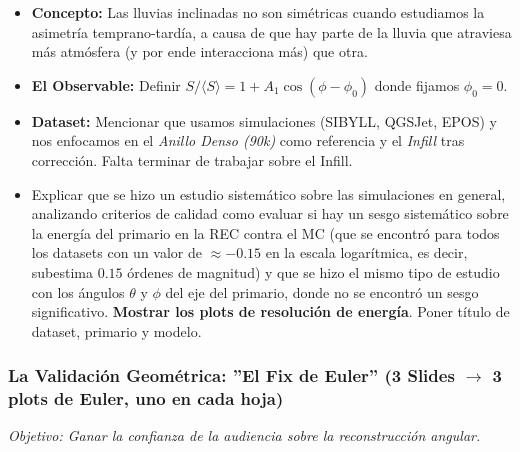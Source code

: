 \begin{itemize}
	\item \textbf{Concepto:} Las lluvias inclinadas no son simétricas cuando estudiamos la asimetría temprano-tardía, a causa de que hay parte de la lluvia que atraviesa más atmósfera (y por ende interacciona más) que otra.
	\item \textbf{El Observable:} Definir $S / \langle S \rangle = 1 + A_1 \cos(\phi - \phi_0)$ donde fijamos $\phi_0 = 0$.
	\item \textbf{Dataset:} Mencionar que usamos simulaciones (SIBYLL, QGSJet, EPOS) y nos enfocamos en el \textit{Anillo Denso (90k)} como referencia y el \textit{Infill} tras corrección. Falta terminar de trabajar sobre el Infill.
	\item Explicar que se hizo un estudio sistemático sobre las simulaciones en general, analizando criterios de calidad como evaluar si hay un sesgo sistemático sobre la energía del primario en la REC contra el MC (que se encontró para todos los datasets con un valor de $\approx -0.15$ en la escala logarítmica, es decir, subestima $0.15$ órdenes de magnitud) y que se hizo el mismo tipo de estudio con los ángulos $\theta$ y $\phi$ del eje del primario, donde no se encontró un sesgo significativo. \textbf{Mostrar los plots de resolución de energía}. Poner título de dataset, primario y modelo.
\end{itemize}

\subsubsection{La Validación Geométrica: ''El Fix de Euler'' (3 Slides $\rightarrow$ 3 plots de Euler, uno en cada hoja)}

\textit{Objetivo: Ganar la confianza de la audiencia sobre la reconstrucción angular.}

